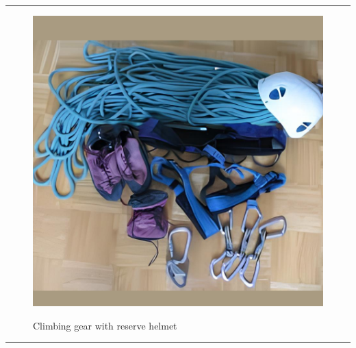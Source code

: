 \documentclass{article}
\begin{document}
    
        \par\noindent\rule{\textwidth}{0.4pt}
    \begin{figure}[H]
        \centering
        \begin{minipage}{0.25\textwidth}
            \centering
            \includegraphics[width=\textwidth]{../SurvivalItemImages/climbinggear}
        \end{minipage}\hfill
        \begin{minipage}{0.7\textwidth}
            \centering
            \Large Climbing gear with reserve helmet
        \end{minipage}
    \end{figure}
    \vspace{-0.8em}
    \noindent\rule{\textwidth}{0.4pt}
            
\end{document}
